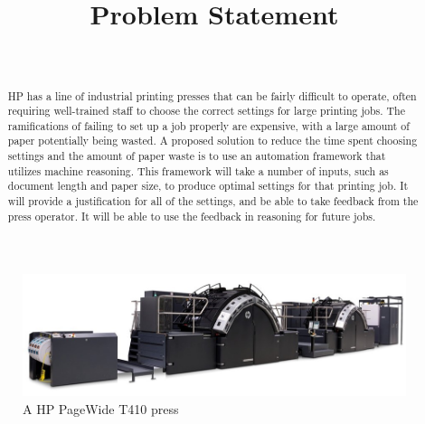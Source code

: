 \documentclass[draftclsnofoot,onecolumn,10pt]{IEEEtran}
\begin{document}
\title{Problem Statement}
\author{\\
}

\maketitle

\bigskip
\bigskip
\bigskip
\begin{figure}[H]
    \centering
    \captionsetup{justification=centering}
    \includegraphics[width=15cm]{HP-T410}
    \caption{A HP PageWide T410 press \cite{press}}
    \label{fig:press}
\end{figure}

\bigskip
\bigskip
\begin{abstract}
HP has a line of industrial printing presses that can be fairly difficult to operate, often requiring well-trained staff to choose the correct settings for large printing jobs. The ramifications of failing to set up a job properly are expensive, with a large amount of paper potentially being wasted. A proposed solution to reduce the time spent choosing settings and the amount of paper waste is to use an automation framework that utilizes machine reasoning. This framework will take a number of inputs, such as document length and paper size, to produce optimal settings for that printing job. It will provide a justification for all of the settings, and be able to take feedback from the press operator. It will be able to use the feedback in reasoning for future jobs. 
\end{abstract}

\pagebreak
\end{document}
